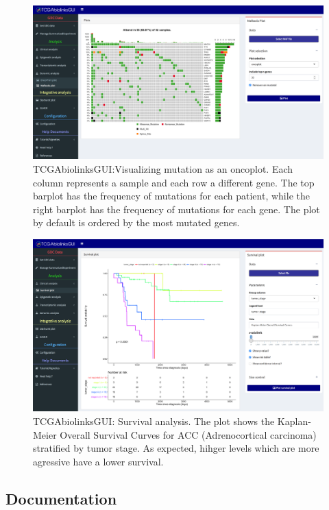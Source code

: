 \begin{figure}
\includegraphics[width=1.0\linewidth]{images/maftools_oncoplot.png}
\caption[TCGAbiolinksGUI: Visualizing mutation as an oncoplot]{TCGAbiolinksGUI:Visualizing mutation as an oncoplot. Each column
represents a sample and each row a different gene. The top barplot has the frequency of mutations for each patient, while
the right barplot has the frequency of mutations for each gene. The plot by default is ordered by the most mutated genes.}
\label{fig:maftools_oncoplot}
\end{figure}


\begin{figure}[]
\includegraphics[width=1.0\linewidth]{images/gui_acc_survival.png}
\caption[TCGAbiolinksGUI: Survival analysis]{TCGAbiolinksGUI: Survival analysis.
The plot shows the Kaplan-Meier Overall Survival Curves for ACC (Adrenocortical carcinoma) stratified by tumor stage.
As expected, hihger levels which are more agressive have a lower survival.}
\label{fig:gui_survival}
\end{figure}

\subsection{Documentation}


